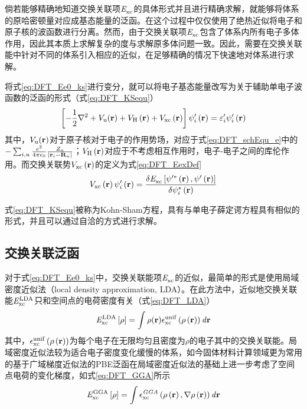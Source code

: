 倘若能够精确地知道交换关联项$\it E_{\rm xc}^{\rm } \it$的具体形式并且进行精确求解，就能够将体系的原哈密顿量对应成基态能量的泛函。在这个过程中仅仅使用了绝热近似将电子和原子核的波函数进行分离。然而，由于交换关联项$\it E_{\rm xc}^{\rm } \it$包含了体系内所有电子多体作用，因此其本质上求解复杂的度与求解原多体问题一致。因此，需要在交换关联能中针对不同的体系引入相应的近似，在足够精确的情况下快速地对体系进行求解。

将式\eqref{eq:DFT_Ee0_ks}进行变分，就可以将电子基态能量改写为关于辅助单电子波函数的泛函的形式（式\eqref{eq:DFT_KSequ}）\chinesecolon
\begin{equation}
    \label{eq:DFT_KSequ}
    \left[-\frac{1}{2}\nabla^2+V_{\rm u}({\mathbf r})+V_{\rm H}\left({\mathbf r}\right)+V_{\rm xc}\left({\mathbf r}\right)\right]\psi'_i\left({\mathbf r}\right)=\varepsilon'_i\psi'_i\left({\mathbf r}\right) 
\end{equation}
其中，$V_{\rm u}({\mathbf r})$对于原子核对于电子的作用势场，对应于式\eqref{eq:DFT_schEqu_e}中的$-\sum_{i,u}\frac{e^2}{4\pi\epsilon_0}\frac{Z_{\rm u}}{\left\lvert{\mathbf r}_i - {\mathbf R}_u\right\rvert}$；$V_{\rm H}\left({\mathbf r}\right)$对应于不考虑相互作用时，电子-电子之间的库伦作用。而交换关联势$V_{\rm xc}\left({\mathbf r}\right)$的定义为式\eqref{eq:DFT_EexDef}\chinesecolon
\begin{equation}
    \label{eq:DFT_EexDef}
    V_{\rm xc}\left({\mathbf r}\right)\psi'_i\left({\mathbf r}\right)=\frac{\delta \it E_{\rm xc}^{\rm } \it\left[\psi'^*\left({\mathbf r}\right),\psi'\left({\mathbf r}\right)\right]}{\delta \psi_i^*\left({\mathbf r}\right)}
\end{equation}

式\eqref{eq:DFT_KSequ}被称为Kohn-Sham方程，具有与单电子薛定谔方程具有相似的形式，并且可以通过自洽的方式进行求解。

\subsection{交换关联泛函}

对于式\eqref{eq:DFT_Ee0_ks}中，交换关联能项$\it E_{\rm xc}^{\rm } \it$的近似，最简单的形式是使用局域密度近似法（local density approximation, LDA）。在此方法中，近似地交换关联能$\it E_{\rm xc}^{\rm LDA} \it$只和空间点的电荷密度有关（式\eqref{eq:DFT_LDA}）\chinesecolon
\begin{equation}
    \label{eq:DFT_LDA}
    \it E_{\rm xc}^{\rm LDA} \it\left[\rho\right]=\int \rho({\mathbf r}) \epsilon_{\rm xc}^{\rm unif} \left(\rho\left({\mathbf r}\right)\right) d{\mathbf r}
\end{equation}
其中，$\epsilon_{\rm xc}^{\rm unif}\left(\rho\left({\mathbf r}\right)\right)$为每个电子在无限均匀且密度为$\rho$的电子其中的交换关联能。局域密度近似法较为适合电子密度变化缓慢的体系，如今固体材料计算领域更为常用的基于广域梯度近似法的PBE泛函在局域密度近似法的基础上进一步考虑了空间点电荷的变化梯度，如式\eqref{eq:DFT_GGA}所示\chinesecolon
\begin{equation}
    \label{eq:DFT_GGA}
    \it E_{\rm xc}^{\rm GGA} \it\left[\rho\right]=\int\epsilon_{\rm xc}^{GGA}\left(\rho\left({\mathbf r}\right),\nabla\rho\left({\mathbf r}\right)\right)d{\mathbf r}
\end{equation}

